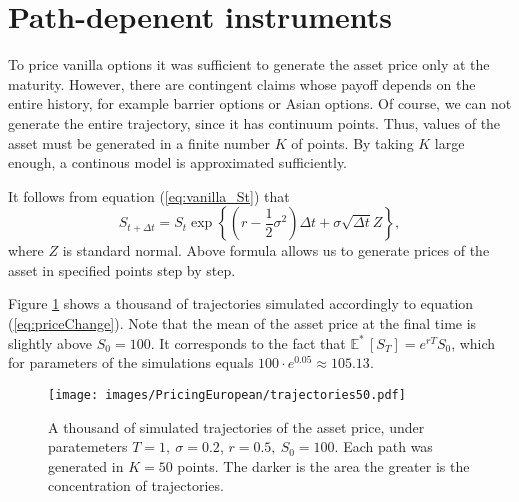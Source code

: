 \documentclass[a4paper,12pt, oneside]{book}
\theoremstyle{definition}
\theoremstyle{remark}
\def\Em{{\mathbb{E}^*}\,}
\begin{document}
\section{Path-depenent instruments}
\label{sec:pricing_complicated}

To price vanilla options it was sufficient to generate the asset price only at the maturity. However, there are contingent claims whose payoff depends on the entire history, for example barrier options or Asian options. Of course, we can not generate the entire trajectory, since it has continuum points. Thus, values of the asset must be generated in a finite number $K$ of points. By taking $K$ large enough, a continous model is approximated sufficiently.

It follows from equation (\ref{eq:vanilla_St}) that
\begin{equation}
 \label{eq:priceChange}
 S_{t + {\Delta} t} = S_t \exp\left\{ (r - \frac{1}{2}\sigma^2)\Delta t + \sigma \sqrt{\Delta t} Z \right\},
\end{equation}
where $Z$ is standard normal. Above formula allows us to generate prices of the asset in specified points step by step.

Figure \ref{fig:trajectories} shows a thousand of trajectories simulated accordingly to equation (\ref{eq:priceChange}). Note that the mean of the asset price at the final time is slightly above $S_0 = 100$. It corresponds to the fact that $\Em [S_T] = e^{rT}S_0$, which for parameters of the simulations equals $100\cdot e^{0.05} \approx 105.13$.

\begin{figure}[ht]
\centering
 \texttt{[image: images/PricingEuropean/trajectories50.pdf]}
\caption{A thousand of simulated trajectories of the asset price, under paratemeters ${T=1},\ {\sigma=0.2}$, ${r=0.5},\ {S_0=100}$. Each path was generated in $K=50$ points. The darker is the area the greater is the concentration of trajectories.}
\label{fig:trajectories}
\end{figure}
\end{document}
